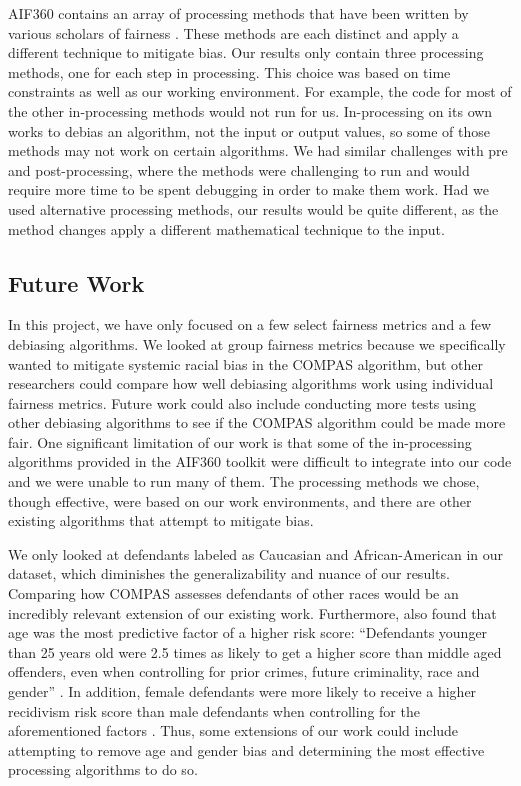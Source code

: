 \documentclass[water,article,submit,moreauthors,pdftex]{mdpi}
\begin{document}
AIF360 contains an array of processing methods that have been written by
various scholars of fairness \citep{aif360-oct-2018}. These methods are
each distinct and apply a different technique to mitigate bias. Our
results only contain three processing methods, one for each step in
processing. This choice was based on time constraints as well as our
working environment. For example, the code for most of the other
in-processing methods would not run for us. In-processing on its own
works to debias an algorithm, not the input or output values, so some of
those methods may not work on certain algorithms. We had similar
challenges with pre and post-processing, where the methods were
challenging to run and would require more time to be spent debugging in
order to make them work. Had we used alternative processing methods, our
results would be quite different, as the method changes apply a
different mathematical technique to the input.

\hypertarget{future-work}{%
\subsection{Future Work}\label{future-work}}

In this project, we have only focused on a few select fairness metrics
and a few debiasing algorithms. We looked at group fairness metrics
because we specifically wanted to mitigate systemic racial bias in the
COMPAS algorithm, but other researchers could compare how well debiasing
algorithms work using individual fairness metrics. Future work could
also include conducting more tests using other debiasing algorithms to
see if the COMPAS algorithm could be made more fair. One significant
limitation of our work is that some of the in-processing algorithms
provided in the AIF360 toolkit were difficult to integrate into our code
and we were unable to run many of them. The processing methods we chose,
though effective, were based on our work environments, and there are
other existing algorithms that attempt to mitigate bias.

We only looked at defendants labeled as Caucasian and African-American
in our dataset, which diminishes the generalizability and nuance of our
results. Comparing how COMPAS assesses defendants of other races would
be an incredibly relevant extension of our existing work. Furthermore,
\citet{larson2016we} also found that age was the most predictive factor
of a higher risk score: ``Defendants younger than 25 years old were 2.5
times as likely to get a higher score than middle aged offenders, even
when controlling for prior crimes, future criminality, race and gender''
\citep{larson2016we}. In addition, female defendants were more likely to
receive a higher recidivism risk score than male defendants when
controlling for the aforementioned factors \citep{larson2016we}. Thus,
some extensions of our work could include attempting to remove age and
gender bias and determining the most effective processing algorithms to
do so.
\end{document}
